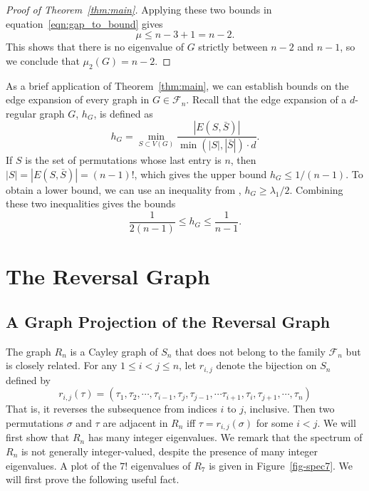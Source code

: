 \begin{proof}[Proof of Theorem~\ref{thm:main}]
  Applying these two bounds in equation~\ref{eqn:gap_to_bound} gives
  \[ \mu \leq n-3 + 1 = n-2 . \]
  This shows that there is no eigenvalue of $G$ strictly between $n-2$ and $n-1$, so
  we conclude that  $\mu_2(G) = n-2$.
\end{proof}


As a brief application of Theorem~\ref{thm:main}, we can establish bounds on the edge
expansion of every graph in $G \in \mathcal{F}_n$.  Recall that the edge
expansion of a $d$-regular graph $G$, $h_G$, is defined as
\[ h_G = \min_{S \subset V(G)} \frac{|E(S,\bar{S})|}{\min(|S|,|\bar{S}|) \cdot d} .\]
If $S$ is the set of permutations whose last entry is $n$, then
$|S| = |E(S,\bar{S})| = (n-1)!$, which gives the upper bound
$h_G \leq 1/(n-1)$.  To obtain a lower bound, we can use an inequality
from \cite{Chung1997},
$h_G \geq \lambda_1 / 2$.   Combining these two inequalities gives the bounds
 \[ \frac{1}{2(n-1)} \leq h_G \leq \frac{1}{n-1} .\] 



\section{The Reversal Graph}\label{s6}

\subsection{A Graph Projection of the Reversal Graph}

The graph $R_n$ is a Cayley graph of $S_n$ that does not
belong to the family $\mathcal{F}_n$ but is closely related.  For any 
$1 \leq i<j \leq n$, let $r_{i,j}$ denote the bijection on $S_n$
defined by
 \[ r_{i,j}(\tau) =  (\tau_1, \tau_2, \cdots, \tau_{i-1}, \tau_{j}, \tau_{j-1}, \cdots \tau_{i+1}, \tau_i, \tau_{j+1}, \cdots , \tau_{n})\] 
That is, it reverses the subsequence from indices $i$ to $j$, inclusive.
Then two permutations $\sigma$ 
and $\tau$ are adjacent in $R_n$ iff $\tau = r_{i,j}(\sigma)$ for some $i< j$.  We will first  show that $R_n$ has many integer eigenvalues.  We remark that the spectrum of $R_n$ is not generally
integer-valued, despite the presence of many integer eigenvalues.  A plot of
the $7!$ eigenvalues of $R_7$ is given in Figure~\ref{fig-spec7}.  We will first prove the following useful fact.


